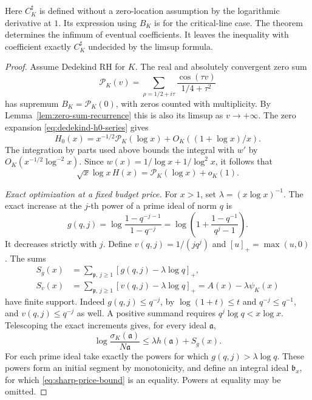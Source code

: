 \documentclass[11pt]{amsart}
\theoremstyle{definition}
\theoremstyle{remark}
\numberwithin{equation}{section}
\begin{document}
Here \(C_K^\sharp\) is defined without a zero-location assumption
by the logarithmic derivative at \(1\). Its expression using
\(B_K\) is for the critical-line case. The theorem determines
the infimum of eventual coefficients. It leaves the inequality
with coefficient exactly \(C_K^\sharp\) undecided by the
limsup formula.

\begin{proof}
Assume Dedekind RH for \(K\). The real and absolutely convergent
zero sum
\[
 \mathcal P_K(v)=\sum_{\rho=1/2+i\tau}
               \frac{\cos(\tau v)}{1/4+\tau^2}
\]
has supremum \(B_K=\mathcal P_K(0)\), with zeros counted with
multiplicity. By Lemma~\ref{lem:zero-sum-recurrence} this is also
its limsup as \(v\to+\infty\). The zero expansion
\eqref{eq:dedekind-h0-series} gives
\[
 H_0(x)=x^{-1/2}\mathcal P_K(\log x)+O_K((1+\log x)/x).
\]
The integration by parts used above bounds the integral with
\(w'\) by \(O_K(x^{-1/2}\log^{-2}x)\).
Since \(w(x)=1/\log x+1/\log^2 x\), it follows that
\begin{equation}\label{eq:sharp-weighted-tail}
 \sqrt{x}\log x\,H(x)=\mathcal P_K(\log x)+o_K(1).
\end{equation}

\emph{Exact optimization at a fixed budget price.}
For \(x>1\), set \(\lambda=(x\log x)^{-1}\).
The exact increase at the \(j\)-th power of a prime ideal of
norm \(q\) is
\[
 g(q,j)=\log\frac{1-q^{-j-1}}{1-q^{-j}}
       =\log\left(1+\frac{1-q^{-1}}{q^j-1}\right).
\]
It decreases strictly with \(j\).
Define \(v(q,j)=1/(j q^j)\) and \([u]_+=\max(u,0)\).
The sums
\begin{align*}
 S_g(x)&=\sum_{\mathfrak p,\,j\ge1}[g(q,j)-\lambda\log q]_+,\\
 S_v(x)&=\sum_{\mathfrak p,\,j\ge1}[v(q,j)-\lambda\log q]_+
       =A(x)-\lambda\psi_K(x)
\end{align*}
have finite support. Indeed \(g(q,j)\le q^{-j}\), by
\(\log(1+t)\le t\) and \(q^{-j}\le q^{-1}\), and
\(v(q,j)\le q^{-j}\) as well. A positive summand requires
\(q^j\log q<x\log x\).
Telescoping the exact increments gives, for every ideal
\(\mathfrak a\),
\begin{equation}\label{eq:sharp-price-bound}
 \log\frac{\sigma_K(\mathfrak a)}{N\mathfrak a}
      \le \lambda h(\mathfrak a)+S_g(x).
\end{equation}
For each prime ideal take exactly the powers for which
\(g(q,j)>\lambda\log q\). These powers form an initial
segment by monotonicity, and define an integral ideal
\(\mathfrak b_x\), for which \eqref{eq:sharp-price-bound}
is an equality. Powers at equality may be omitted.


\end{proof}
\end{document}
